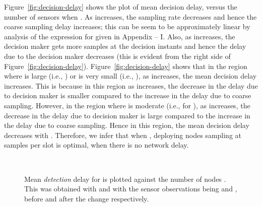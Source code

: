 \documentclass[acmtosn]{acmtrans2m}
\begin{document}
Figure~\ref{fig:decision-delay} shows the plot of mean decision delay,  versus the 
number of sensors when . As  increases, the sampling rate  
decreases and hence the coarse sampling delay  increases; this 
can be seem to be approximately linear by analysis of the expression for  given
in Appendix -- I. Also, 
as  increases, the decision maker gets more samples at the decision instants and 
hence the delay due to the decision maker 
 decreases (this is evident 
from the right side of Figure~\ref{fig:decision-delay}). Figure~\ref{fig:decision-delay} 
shows that in the region where  is large (i.e., ) 
or  is very small (i.e., ), as  increases, the mean 
decision delay increases. This is because in this region as  increases, the decrease 
in the delay due to decision maker is smaller compared to the increase in the delay due 
to coarse sampling. However, in the region where  is moderate (i.e., for ), as  
increases, the decrease in the delay due to decision maker is large compared to the 
increase in the delay due to coarse sampling. Hence in this region, the mean decision 
delay decreases with . Therefore, we infer that when ,
deploying  nodes sampling at  samples per slot is optimal, when there is no 
network delay.

\begin{figure}[t]
   \centering \ 
   \caption{Mean \emph{detection} delay for  is plotted
     against the number of nodes . This was obtained with
      and with the sensor
     observations being  and , before
     and after the change respectively.}
   \label{fig:detection-delay}
 \end{figure}
\end{document}
